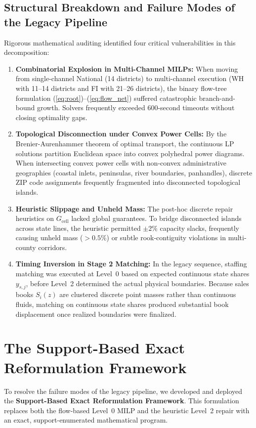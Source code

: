 \documentclass[11pt,a4paper]{article}
\theoremstyle{plain}
\theoremstyle{definition}
\begin{document}
\subsection{Structural Breakdown and Failure Modes of the Legacy Pipeline}
Rigorous mathematical auditing identified four critical vulnerabilities in this decomposition:
\begin{enumerate}[leftmargin=1.5em]
    \item \textbf{Combinatorial Explosion in Multi-Channel MILPs:} When moving from single-channel National (14 districts) to multi-channel execution (WH with 11--14 districts and FI with 21--26 districts), the binary flow-tree formulation (\ref{eq:root})--(\ref{eq:flow_net}) suffered catastrophic branch-and-bound growth. Solvers frequently exceeded 600-second timeouts without closing optimality gaps.
    \item \textbf{Topological Disconnection under Convex Power Cells:} By the Brenier-Aurenhammer theorem of optimal transport, the continuous LP solutions partition Euclidean space into convex polyhedral power diagrams. When intersecting convex power cells with non-convex administrative geographies (coastal inlets, peninsulas, river boundaries, panhandles), discrete ZIP code assignments frequently fragmented into disconnected topological islands.
    \item \textbf{Heuristic Slippage and Unheld Mass:} The post-hoc discrete repair heuristics on $G_{\text{cell}}$ lacked global guarantees. To bridge disconnected islands across state lines, the heuristic permitted $\pm 2\%$ capacity slacks, frequently causing unheld mass ($>0.5\%$) or subtle rook-contiguity violations in multi-county corridors.
    \item \textbf{Timing Inversion in Stage 2 Matching:} In the legacy sequence, staffing matching was executed at Level~0 based on expected continuous state shares $y_{s,j}$, before Level~2 determined the actual physical boundaries. Because sales books $S_i(z)$ are clustered discrete point masses rather than continuous fluids, matching on continuous state shares produced substantial book displacement once realized boundaries were finalized.
\end{enumerate}

\section{The Support-Based Exact Reformulation Framework}

To resolve the failure modes of the legacy pipeline, we developed and deployed the \textbf{Support-Based Exact Reformulation Framework}. This formulation replaces both the flow-based Level~0 MILP and the heuristic Level~2 repair with an exact, support-enumerated mathematical program.
\end{document}

